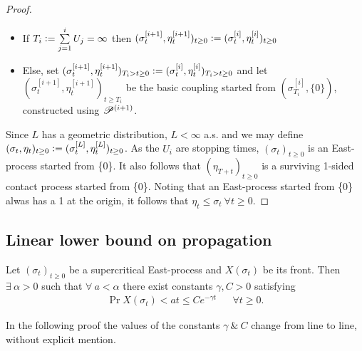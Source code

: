 \begin{proof}
\begin{enumerate}
\begin{itemize}
    \item If $T_i \vcentcolon= \sum\limits^i_{j=1} U_j = \infty$ then $(\sigma^{[i+1]}_t, \eta^{[i+1]}_t)_{t \geq 0} \vcentcolon= (\sigma^{[i]}_t, \eta^{[i]}_t)_{t \geq 0}$
    \item Else, set $(\sigma^{[i+1]}_t, \eta^{[i+1]}_t)_{T_i > t \geq 0} \vcentcolon= (\sigma^{[i]}_t, \eta^{[i]}_t)_{T_i > t \geq 0}$ and let $(\sigma^{[i+1]}_t, \eta^{[i+1]}_t)_{t \geq T_i}$ be the basic coupling started from $(\sigma^{[i]}_{T_i}, \{0\})$, constructed using $\mathscr{P}^{(i+1)}$. 
  \end{itemize}
\end{enumerate}
Since $L$ has a geometric distribution, $L < \infty$ a.s. and we may define $(\sigma_t, \eta_t)_{t \geq 0} \vcentcolon= (\sigma^{[L]}_t, \eta^{[L]}_t)_{t \geq 0}$. As the $U_i$ are stopping times, $(\sigma_t)_{t \geq 0}$ is an East-process started from \{0\}. It also follows that $(\eta_{T+t})_{t \geq 0}$ is a surviving 1-sided contact process started from \{0\}. Noting that an East-process started from \{0\} alwas has a 1 at the origin, it follows that $\eta_t \leq \sigma_t\ \forall t \geq 0$. 
\end{proof}

\subsection{Linear lower bound on propagation}

\begin{corollary}\label{cor:lower_linear_speed}
Let $(\sigma_t)_{t \geq 0}$ be a supercritical East-process and $X(\sigma_t)$ be its front. Then $\exists\ \alpha > 0$ such that $\forall\ a < \alpha$ there exist constants $\gamma, C > 0$ satisfying 
\begin{align}
\Pr{X(\sigma_t) < at} \leq C e^{-\gamma t} && \forall t \geq 0. 
\end{align}
\end{corollary}

\begin{remark}
In the following proof the values of the constants $\gamma\ \&\ C$ change from line to line, without explicit mention. 
\end{remark}

